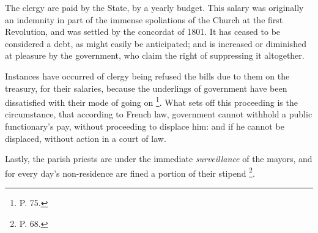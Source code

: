 The clergy are paid by the State, by a yearly
budget. This salary was originally an indemnity in part of the immense
spoliations of the Church at the first Revolution, and was settled by
the concordat of 1801. It has ceased to be considered a debt, as might
easily be anticipated; and is increased or diminished at pleasure by
the government, who claim the right of suppressing it altogether.

Instances have occurred of clergy being refused
the bills due to them on the treasury, for their salaries, because the
underlings of government have been dissatisfied with their mode of
going on \footnote{P. 75.}. What sets off
this proceeding is the circumstance, that according to French law,
government cannot withhold a public functionary's pay, without
proceeding to displace him: and if he cannot be displaced, without
action in a court of law.

Lastly, the parish priests are under the
immediate \emph{surveillance} of the mayors, and for every day's
non-residence are fined a portion of their stipend \footnote{P. 68.}.

